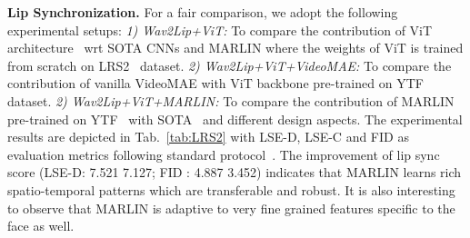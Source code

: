 \documentclass[10pt,twocolumn,letterpaper]{article}
\begin{document}
\noindent \textbf{Lip Synchronization.} For a fair comparison, we adopt the following experimental setups: \textit{1) Wav2Lip+ViT:} To compare the contribution of ViT architecture~\cite{dosovitskiyImage2021} wrt SOTA CNNs and MARLIN where the weights of ViT is trained from scratch on LRS2~\cite{chungLip2017} dataset. \textit{2) Wav2Lip+ViT+VideoMAE:} To compare the contribution of vanilla VideoMAE with ViT backbone pre-trained on YTF~\cite{wolfFace2011} dataset. \textit{2) Wav2Lip+ViT+MARLIN:} To compare the contribution of MARLIN pre-trained on YTF~\cite{wolfFace2011} with SOTA~\cite{siSpeech2Video2021,prajwalLip2020,wangAttentionBased2022} and different design aspects. The experimental results are depicted in Tab.~\ref{tab:LRS2} with LSE-D, LSE-C  and FID  as evaluation metrics following standard protocol~\cite{heuselGANs2017,siSpeech2Video2021,prajwalLip2020,wangAttentionBased2022}. The improvement of lip sync score (LSE-D: 7.521  7.127; FID : 4.887  3.452) indicates that MARLIN learns rich spatio-temporal patterns which are transferable and robust. It is also interesting to observe that MARLIN is adaptive to very fine grained features specific to the face as well. 

\begin{table}[t]
\centering
\caption{\textbf{Few shot adaptation on different facial tasks.} Comparison of different methods for few shot adaptation.}
\label{tab:few-shot}
\vspace{-5mm}
\end{table}
\end{document}

